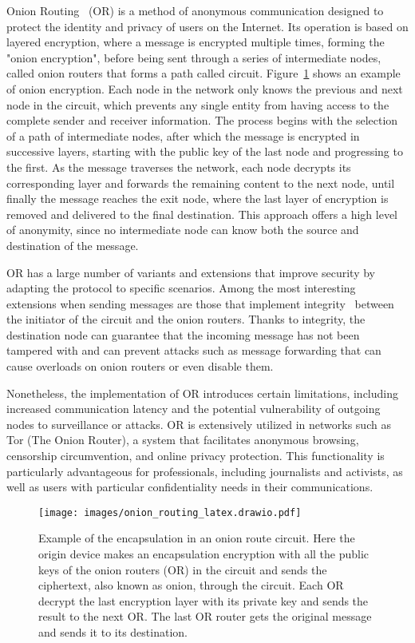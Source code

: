 \documentclass[conference]{IEEEtran}
\begin{document}
Onion Routing~\cite{goldschlag1999onion} (OR) is a method of anonymous communication designed to protect the identity and privacy of users on the Internet. Its operation is based on layered encryption, where a message is encrypted multiple times, forming the "onion encryption", before being sent through a series of intermediate nodes, called onion routers that forms a path called circuit. Figure~\ref{fig:onion} shows an example of onion encryption. Each node in the network only knows the previous and next node in the circuit, which prevents any single entity from having access to the complete sender and receiver information. The process begins with the selection of a path of intermediate nodes, after which the message is encrypted in successive layers, starting with the public key of the last node and progressing to the first. As the message traverses the network, each node decrypts its corresponding layer and forwards the remaining content to the next node, until finally the message reaches the exit node, where the last layer of encryption is removed and delivered to the final destination. This approach offers a high level of anonymity, since no intermediate node can know both the source and destination of the message.

OR has a large number of variants and extensions that improve security by adapting the protocol to specific scenarios. Among the most interesting extensions when sending messages are those that implement integrity~\cite{kuhn2020breaking,kuhn2021onion} between the initiator of the circuit and the onion routers. Thanks to integrity, the destination node can guarantee that the incoming message has not been tampered with and can prevent attacks such as message forwarding that can cause overloads on onion routers or even disable them.

Nonetheless, the implementation of OR introduces certain limitations, including increased communication latency and the potential vulnerability of outgoing nodes to surveillance or attacks. OR is extensively utilized in networks such as Tor (The Onion Router), a system that facilitates anonymous browsing, censorship circumvention, and online privacy protection. This functionality is particularly advantageous for professionals, including journalists and activists, as well as users with particular confidentiality needs in their communications.

\begin{figure}[t]
    \centerline{\texttt{[image: images/onion\_routing\_latex.drawio.pdf]}}
    \caption{Example of the encapsulation in an onion route circuit. Here the origin device makes an encapsulation encryption with all the public keys of the onion routers (OR) in the circuit and sends the ciphertext, also known as onion, through the circuit. Each OR decrypt the last encryption layer with its private key and sends the result to the next OR. The last OR router gets the original message and sends it to its destination.
    \label{fig:onion}}
\end{figure}
\raggedbottom
\end{document}
